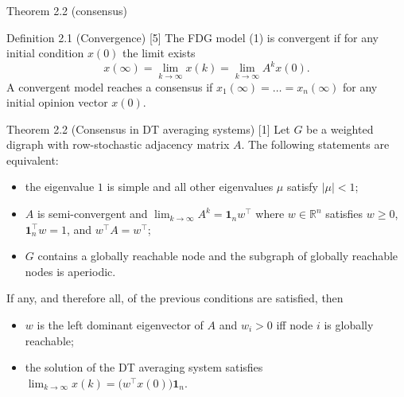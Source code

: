 \begin{frame}[label=bk-fdg-thm]{Theorem 2.2 (consensus)}
  \scriptsize
  \begin{block}{Definition 2.1 (Convergence) [5]}
    The FDG model (1) is convergent if for any initial condition $x(0)$ the limit exists
    \[ x(\infty) = \lim_{k \to \infty} x(k) = \lim_{k \to \infty} A^k x(0). \]
    A convergent model reaches a consensus if $x_1(\infty) = \dots = x_n(\infty)$ for any
    initial opinion vector $x(0)$.
  \end{block}
  \begin{block}{Theorem 2.2 (Consensus in DT averaging systems) [1]}
    Let $G$ be a weighted digraph with row-stochastic adjacency matrix $A$. The following
    statements are equivalent:
    \begin{itemize}
      \item[(A1)] the eigenvalue $1$ is simple and all other eigenvalues $\mu$ satisfy
                  $|\mu| < 1$;
      \item[(A2)] $A$ is semi-convergent and $\lim_{k \to \infty} A^k = \mathbf{1}_n w^\top$
                  where $w \in \mathbb{R}^n$ satisfies $w \geq 0$,
                  $\mathbf{1}_n^\top w = 1$, and $w^\top A = w^\top$;
      \item[(A3)] $G$ contains a globally reachable node and the subgraph of globally
                  reachable nodes is aperiodic.
    \end{itemize}
    If any, and therefore all, of the previous conditions are satisfied, then
    \begin{itemize}
      \item[(i)]  $w$ is the left dominant eigenvector of $A$ and $w_i > 0$ iff node $i$ is
                  globally reachable;
      \item[(ii)] the solution of the DT averaging system satisfies
                  $\lim_{k \to \infty} x(k) = \big(w^\top x(0)\big)\mathbf{1}_n$.
    \end{itemize}
  \end{block}
\end{frame}

